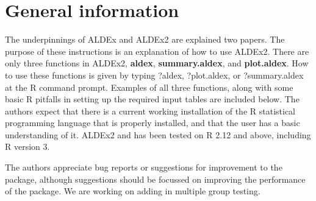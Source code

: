 \documentclass[11pt]{amsart}
\begin{document}
\section{General information}
The underpinnings of ALDEx and ALDEx2 are explained two papers\cite{fernandes:2013, fernandes:2014}. The purpose of these instructions is an explanation of how to use ALDEx2. There are only three functions in ALDEx2, {\bf aldex}, {\bf summary.aldex}, and {\bf plot.aldex}. How to use these functions is given by typing ?aldex, ?plot.aldex, or ?summary.aldex at the R command prompt. Examples of all three functions, along with some basic R pitfalls in setting up the required input tables are included below. The authors expect that there is a current working installation of the R statistical programming language that is properly installed, and that the user has a basic understanding of it. ALDEx2 and has been tested on R 2.12 and above, including R version 3.

The authors appreciate bug reports or suggestions for improvement to the package, although suggestions should be focussed on improving the performance of the package. We are working on adding in multiple group testing.
\end{document}
